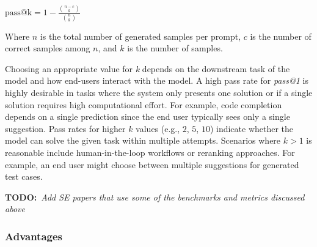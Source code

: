 \documentclass[11pt]{article}
\newcommand{\todo}[1]{{\textbf{TODO:}\ \textit{#1}}} %
\begin{document}
$\text{pass@k} = 1 - \frac{\binom{n-c}{k}}{\binom{n}{k}}$

Where $n$ is the total number of generated samples per prompt, $c$ is the number of correct samples among  $n$, and $k$ is the number of samples.

Choosing an appropriate value for \emph{k} depends on the downstream task of the model and how end-users interact with the model.
A high pass rate for \emph{pass@1} is highly desirable in tasks where the system only presents one solution or if a single solution requires high computational effort.
For example, code completion depends on a single prediction since the end user typically sees only a single suggestion.
Pass rates for higher $k$ values (e.g., $2$, $5$, $10$) indicate whether the model can solve the given task within multiple attempts.
Scenarios where $k>1$ is reasonable include human-in-the-loop workflows or reranking approaches.
For example, an end user might choose between multiple suggestions for generated test cases.




\todo{Add SE papers that use some of the benchmarks and metrics discussed above}

\subsubsection{Advantages}
\end{document}
